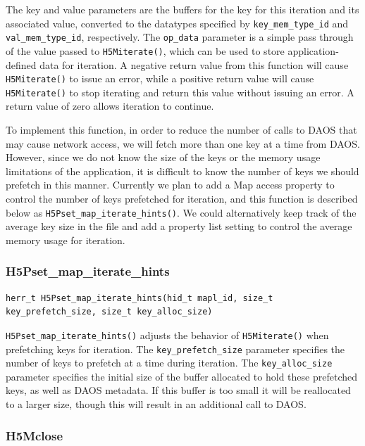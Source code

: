 The key and value parameters are the buffers for the key for this iteration and its associated value, converted to the datatypes specified by \verb+key_mem_type_id+ and \verb+val_mem_type_id+, respectively. The \verb+op_data+ parameter is a simple pass through of the value passed to \verb+H5Miterate()+, which can be used to store application-defined data for iteration. A negative return value from this function will cause \verb+H5Miterate()+ to issue an error, while a positive return value will cause \verb+H5Miterate()+ to stop iterating and return this value without issuing an error. A return value of zero allows iteration to continue.

To implement this function, in order to reduce the number of calls to DAOS that may cause network access, we will fetch more than one key at a time from DAOS. However, since we do not know the size of the keys or the memory usage limitations of the application, it is difficult to know the number of keys we should prefetch in this manner. Currently we plan to add a Map access property to control the number of keys prefetched for iteration, and this function is described below as \verb+H5Pset_map_iterate_hints()+. We could alternatively keep track of the average key size in the file and add a property list setting to control the average memory usage for iteration.

\subsubsection{H5Pset\_map\_iterate\_hints}

{
\begin{lstlisting}
herr_t H5Pset_map_iterate_hints(hid_t mapl_id, size_t key_prefetch_size, size_t key_alloc_size)
\end{lstlisting}
}

\verb+H5Pset_map_iterate_hints()+ adjusts the behavior of \verb+H5Miterate()+ when prefetching keys for iteration. The \verb+key_prefetch_size+ parameter specifies the number of keys to prefetch at a time during iteration. The \verb+key_alloc_size+ parameter specifies the initial size of the buffer allocated to hold these prefetched keys, as well as DAOS metadata. If this buffer is too small it will be reallocated to a larger size, though this will result in an additional call to DAOS.

\subsubsection{H5Mclose}

